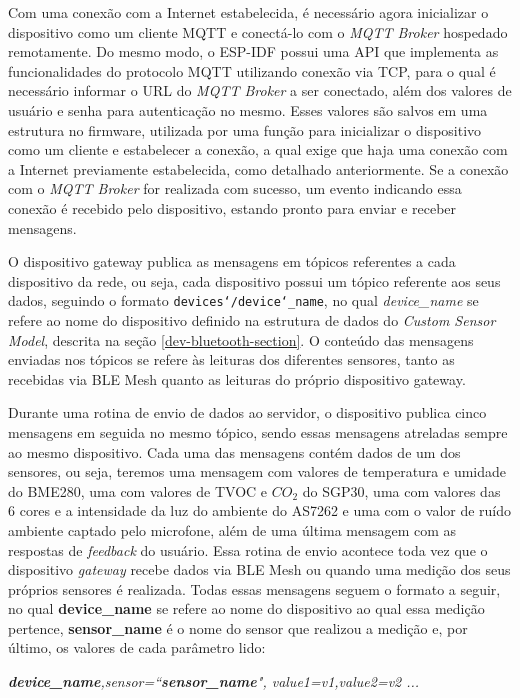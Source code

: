 \documentclass[../monografia.tex]{subfiles}
\begin{document}
Com uma conexão com a Internet estabelecida, é necessário agora inicializar o dispositivo como um cliente MQTT e conectá-lo com o \textit{MQTT Broker} hospedado remotamente. Do mesmo modo, o ESP-IDF possui uma API que implementa as funcionalidades do protocolo MQTT utilizando conexão via TCP, para o qual é necessário informar o URL do \textit{MQTT Broker} a ser conectado, além dos valores de usuário e senha para autenticação no mesmo. Esses valores são salvos em uma estrutura no firmware, utilizada por uma função para inicializar o dispositivo como um cliente e estabelecer a conexão, a qual exige que haja uma conexão com a Internet previamente estabelecida, como detalhado anteriormente. Se a conexão com o \textit{MQTT Broker} for realizada com sucesso, um evento indicando essa conexão é recebido pelo dispositivo, estando pronto para enviar e receber mensagens.

O dispositivo gateway publica as mensagens em tópicos referentes a cada dispositivo da rede, ou seja, cada dispositivo possui um tópico referente aos seus dados, seguindo o formato \texttt{devices\char`/device\char`_name}, no qual \textit{device\_name} se refere ao nome do dispositivo definido na estrutura de dados do \textit{Custom Sensor Model}, descrita na seção \ref{dev-bluetooth-section}. O conteúdo das mensagens enviadas nos tópicos se refere às leituras dos diferentes sensores, tanto as recebidas via BLE Mesh quanto as leituras do próprio dispositivo gateway.

Durante uma rotina de envio de dados ao servidor, o dispositivo publica cinco mensagens em seguida no mesmo tópico, sendo essas mensagens atreladas sempre ao mesmo dispositivo. Cada uma das mensagens contém dados de um dos sensores, ou seja, teremos uma mensagem com valores de temperatura e umidade do BME280, uma com valores de TVOC e $CO_{2}$ do SGP30, uma com valores das 6 cores e a intensidade da luz do ambiente do AS7262 e uma com o valor de ruído ambiente captado pelo microfone, além de uma última mensagem com as respostas de \textit{feedback} do usuário. Essa rotina de envio acontece toda vez que o dispositivo \textit{gateway} recebe dados via BLE Mesh ou quando uma medição dos seus próprios sensores é realizada. Todas essas mensagens seguem o formato a seguir, no qual \textbf{device\_name} se refere ao nome do dispositivo ao qual essa medição pertence, \textbf{sensor\_name} é o nome do sensor que realizou a medição e, por último, os valores de cada parâmetro lido:

\begin{center}
	\textit{ \textbf{device\_name},sensor=``\textbf{sensor\_name}", value1=v1,value2=v2 ... }
\end{center}
\end{document}
